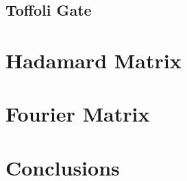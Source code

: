 \documentclass[oneside]{thesisclass}
\begin{document}
\section{Toffoli Gate}

\chapter{Hadamard Matrix}

\chapter{Fourier Matrix}

\chapter{Conclusions}




\end{document}
